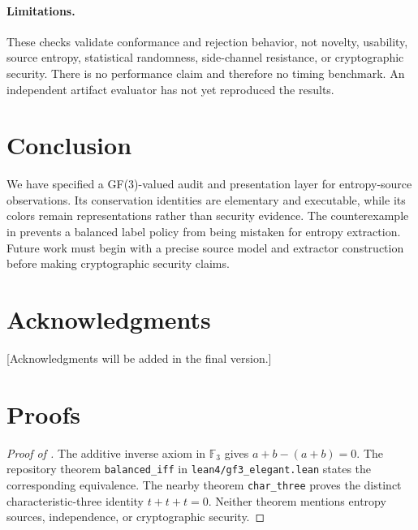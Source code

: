 \documentclass[preprint,nohyperxmp]{iacrtrans}
\begin{document}
\paragraph{Limitations.} These checks validate conformance and rejection
behavior, not novelty, usability, source entropy, statistical randomness,
side-channel resistance, or cryptographic security. There is no performance
claim and therefore no timing benchmark. An independent artifact evaluator
has not yet reproduced the results.

\section{Conclusion}
\label{sec:conclusion}

We have specified a GF(3)-valued audit and presentation layer for entropy-source observations. Its conservation identities are elementary and executable, while its colors remain representations rather than security evidence. The counterexample in  prevents a balanced label policy from being mistaken for entropy extraction. Future work must begin with a precise source model and extractor construction before making cryptographic security claims.

\section*{Acknowledgments}

[Acknowledgments will be added in the final version.]




\appendix
\section{Proofs}
\label{app:proofs}

\begin{proof}[Proof of ]
The additive inverse axiom in $\mathbb{F}_3$ gives
$a+b-(a+b)=0$. The repository theorem
\texttt{balanced\_iff} in \texttt{lean4/gf3\_elegant.lean} states the
corresponding equivalence. The nearby theorem \texttt{char\_three} proves the
distinct characteristic-three identity $t+t+t=0$. Neither theorem mentions
entropy sources, independence, or cryptographic security.
\end{proof}
\end{document}
